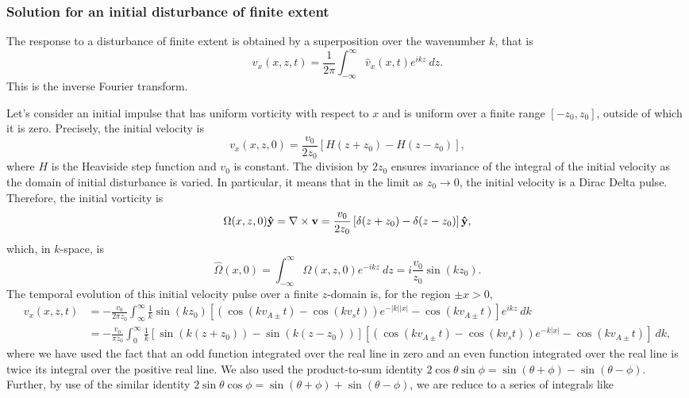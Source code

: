 \documentclass[12pt, draft]{../style-files/ociamthesis}
\begin{document}
\subsubsection{Solution for an initial disturbance of finite extent}

The response to a disturbance of finite extent is obtained by a superposition over the wavenumber $k$, that is
\begin{equation}
v_x(x, z, t) = \frac{1}{2\pi}\int_{-\infty}^{\infty} \hat{v}_x(x, t) e^{ikz} ~dz.
\end{equation}
This is the inverse Fourier transform.

Let's consider an initial impulse that has uniform vorticity with respect to $x$ and is uniform over a finite range $[-z_0, z_0]$, outside of which it is zero. Precisely, the initial velocity is
\begin{equation}
v_x(x, z, 0) = \frac{v_0}{2z_0}\left[H(z + z_0) - H(z - z_0)\right],
\end{equation}
where $H$ is the Heaviside step function and $v_0$ is constant. The division by $2z_0$ ensures invariance of the integral of the initial velocity as the domain of initial disturbance is varied. In particular, it means that in the limit as $z_0 \to 0$, the initial velocity is a Dirac Delta pulse. Therefore, the initial vorticity is
\begin{equation}
\Omega(x, z, 0) \mathbf{\hat{y}} = \nabla \times \mathbf{v} = \frac{v_0}{2z_0}\left[\delta(z + z_0) - \delta(z - z_0)\right] \mathbf{\hat{y}},
\end{equation}
which, in $k$-space, is
\begin{equation}
\hat{\Omega}(x, 0) = \int_{-\infty}^{\infty} \Omega(x, z, 0) e^{-ikz} ~dz = i\frac{v_0}{z_0}\sin(kz_0).
\end{equation}
The temporal evolution of this initial velocity pulse over a finite $z$-domain is, for the region $\pm x > 0$,
\begin{align}
v_x(x, z, t) &= -\frac{v_0}{2\pi z_0} \int_{\infty}^{\infty} \frac{1}{k}\sin(kz_0) \left[\left(\cos(kv_{A\pm}t) - \cos(kv_st)\right)e^{-|k||x|} - \cos(kv_{A\pm}t)\right] e^{ikz} ~dk \\
& = -\frac{v_0}{\pi z_0} \int_{0}^{\infty} \frac{1}{k} \left[\sin(k(z + z_0)) - \sin(k(z - z_0))\right] \left[(\cos(kv_{A\pm}t) - \cos(kv_st))e^{-k|x|} - \cos(kv_{A\pm}t)\right] ~dk,
\end{align}
where we have used the fact that an odd function integrated over the real line in zero and an even function integrated over the real line is twice its integral over the positive real line. We also used the product-to-sum identity $2\cos{\theta}\sin{\phi} = \sin(\theta + \phi) - \sin(\theta - \phi)$. Further, by use of the similar identity $2\sin{\theta}\cos{\phi} = \sin(\theta + \phi) + \sin(\theta - \phi)$, we are reduce to a series of integrals like
\end{document}
